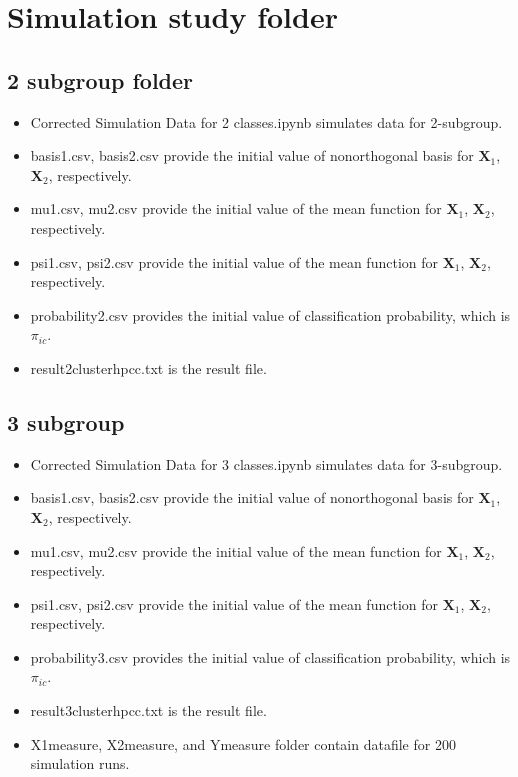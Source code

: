 \documentclass[useAMS,usenatbib,referee]{article}
\newcommand{\BX}{{\pmb X}}
\begin{document}
\section{Simulation study folder}
\subsection{2 subgroup folder}
\begin{itemize}
\item Corrected Simulation Data for 2 classes.ipynb simulates data for 2-subgroup.
    \item basis1.csv, basis2.csv provide the initial value of nonorthogonal basis for $\BX_1$, $\BX_2$, respectively.
\item mu1.csv, mu2.csv provide the initial value of the mean function for $\BX_1$, $\BX_2$, respectively.
\item psi1.csv, psi2.csv provide the initial value of the mean function for $\BX_1$, $\BX_2$, respectively.
\item probability2.csv provides the initial value of classification probability, which is $\pi_{ic}$.
\item result\textunderscore 2cluster\textunderscore hpcc.txt is the result file.
\end{itemize}

\subsection{3 subgroup}
\begin{itemize}
\item  Corrected Simulation Data for 3 classes.ipynb simulates data for 3-subgroup.
    \item basis1.csv, basis2.csv provide the initial value of nonorthogonal basis for $\BX_1$, $\BX_2$, respectively.
\item mu1.csv, mu2.csv provide the initial value of the mean function for $\BX_1$, $\BX_2$, respectively.
\item psi1.csv, psi2.csv provide the initial value of the mean function for $\BX_1$, $\BX_2$, respectively.
\item probability3.csv provides the initial value of classification probability, which is $\pi_{ic}$.
\item result\textunderscore 3cluster\textunderscore hpcc.txt is the result file.
\item  X1measure, X2measure, and Ymeasure folder contain datafile for 200 simulation runs.
\end{itemize}
\end{document}
